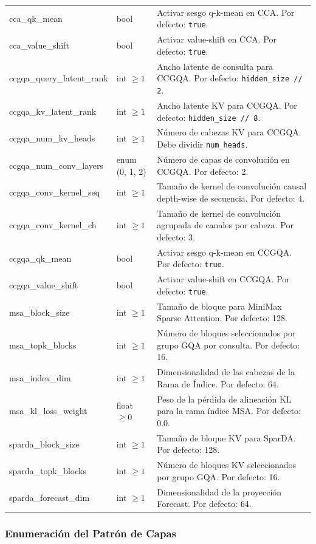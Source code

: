 \begin{longtable}{>{\ttfamily}l>{\raggedright\arraybackslash}p{3.5cm}>{\raggedright\arraybackslash}p{8.5cm}}
cca\_qk\_mean & bool & Activar sesgo q-k-mean en CCA. Por defecto: \texttt{true}. \\
cca\_value\_shift & bool & Activar value-shift en CCA. Por defecto: \texttt{true}. \\
ccgqa\_query\_latent\_rank & int $\ge 1$ & Ancho latente de consulta para CCGQA. Por defecto: \texttt{hidden\_size // 2}. \\
ccgqa\_kv\_latent\_rank & int $\ge 1$ & Ancho latente KV para CCGQA. Por defecto: \texttt{hidden\_size // 8}. \\
ccgqa\_num\_kv\_heads & int $\ge 1$ & Número de cabezas KV para CCGQA. Debe dividir \texttt{num\_heads}. \\
ccgqa\_num\_conv\_layers & enum (0, 1, 2) & Número de capas de convolución en CCGQA. Por defecto: 2. \\
ccgqa\_conv\_kernel\_seq & int $\ge 1$ & Tamaño de kernel de convolución causal depth-wise de secuencia. Por defecto: 4. \\
ccgqa\_conv\_kernel\_ch & int $\ge 1$ & Tamaño de kernel de convolución agrupada de canales por cabeza. Por defecto: 3. \\
ccgqa\_qk\_mean & bool & Activar sesgo q-k-mean en CCGQA. Por defecto: \texttt{true}. \\
ccgqa\_value\_shift & bool & Activar value-shift en CCGQA. Por defecto: \texttt{true}. \\
msa\_block\_size & int $\ge 1$ & Tamaño de bloque para MiniMax Sparse Attention. Por defecto: 128. \\
msa\_topk\_blocks & int $\ge 1$ & Número de bloques seleccionados por grupo GQA por consulta. Por defecto: 16. \\
msa\_index\_dim & int $\ge 1$ & Dimensionalidad de las cabezas de la Rama de Índice. Por defecto: 64. \\
msa\_kl\_loss\_weight & float $\ge 0$ & Peso de la pérdida de alineación KL para la rama índice MSA. Por defecto: 0.0. \\
sparda\_block\_size & int $\ge 1$ & Tamaño de bloque KV para SparDA. Por defecto: 128. \\
sparda\_topk\_blocks & int $\ge 1$ & Número de bloques KV seleccionados por grupo GQA. Por defecto: 16. \\
sparda\_forecast\_dim & int $\ge 1$ & Dimensionalidad de la proyección Forecast. Por defecto: 64. \\
\end{longtable}

\subsubsection{Enumeración del Patrón de Capas}
\label{tab:layer-pattern}

